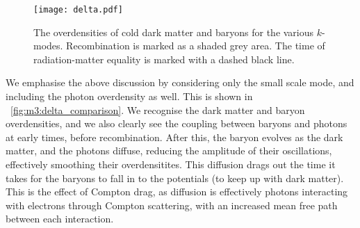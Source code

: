 
    \begin{figure}
        \texttt{[image: delta.pdf]}
        \caption{The overdensities of cold dark matter and baryons for the various $k$-modes. Recombination is marked as a shaded grey area. The time of radiation-matter equality is marked with a dashed black line.}
        \label{fig:m3:delta}
    \end{figure}
    
    We emphasise the above discussion by considering only the small scale mode, and including the photon overdensity as well. This is shown in ~\cref{fig:m3:delta_comparison}. We recognise the dark matter and baryon overdensities, and we also clearly see the coupling between baryons and photons at early times, before recombination. After this, the baryon evolves as the dark matter, and the photons diffuse, reducing the amplitude of their oscillations, effectively smoothing their overdensitites. This diffusion drags out the time it takes for the baryons to fall in to the potentials (to keep up with dark matter). This is the effect of Compton drag, as diffusion is effectively photons interacting with electrons through Compton scattering, with an increased mean free path between each interaction. 

